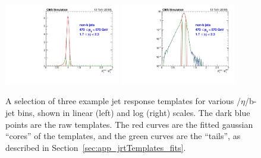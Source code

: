 \begin{figure}[htbp]
\begin{center}
    \includegraphics[width=0.45\textwidth]{figs/jetmet/pt10_eta06_nonbjets_lin.pdf}
    \includegraphics[width=0.45\textwidth]{figs/jetmet/pt10_eta06_nonbjets_log.pdf} \\
    \caption{A selection of three example jet response templates for various \pt/$\eta$/b-jet bins, shown in linear (left) and log (right) scales.
    The dark blue points are the raw templates. The red curves are the fitted gaussian ``cores'' of the templates, and the green
    curves are the ``tails'', as described in Section~\ref{sec:app_jrtTemplates_fits}.
           }
    \label{fig:jrt_examples}
  \end{center}
\end{figure}

